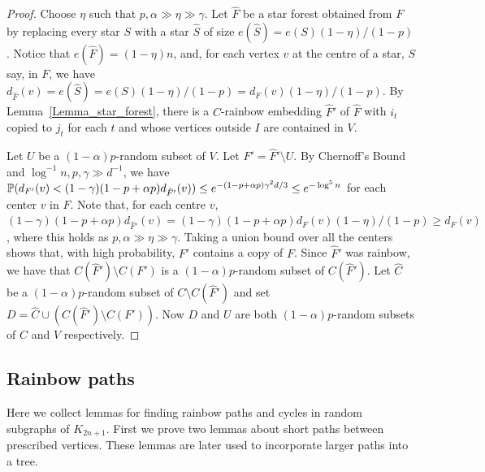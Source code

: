 \begin{proof}
Choose $\eta$ such that $p, \alpha \gg \eta\gg  \gamma$.
Let $\hat F$ be a star forest obtained from $F$ by replacing every star $S$ with a star $\hat S$ of size $e(\hat S)=e(S)(1-\eta)/(1-p)$. Notice that $e(\hat F)=(1-\eta)n$, and, for each vertex $v$ at the centre of a star, $S$ say, in $F$, we have $d_{\hat F}(v)=e(\hat S)=e(S)(1-\eta)/(1-p)=d_F(v)(1-\eta)/(1-p)$. By Lemma~\ref{Lemma_star_forest}, there  is a $C$-rainbow embedding $\hat F'$ of $\hat F$   with $i_t$ copied to $j_t$ for each $t$  and   whose  vertices outside $I$ are contained in $V$.

Let $U$ be a $(1-\alpha)p$-random subset of $V$. Let $F'=\hat F' \setminus U$.  By Chernoff's Bound and $\log^{-1}n, p, \gamma \gg d^{-1}$, we have $\P(d_{F'}(v)< (1-\gamma)(1-p+\alpha p)d_{\hat F'}(v))\leq e^{-(1-p+\alpha p)\gamma^2d/3}\leq e^{-\log^5 n}$ for each center $v$ in $F$. Note that, for each centre $v$, $(1-\gamma)(1-p+\alpha p)d_{\hat F'}(v)=(1-\gamma)(1-p+\alpha p) d_F(v)(1-\eta)/(1-p) \geq d_F(v)$, where this holds as $p,\alpha\gg \eta\gg \gamma$.  Taking a union bound over all the centers shows that, with high probability, $F'$ contains a copy of $F$.
Since $\hat F'$ was rainbow, we have that $C(\hat F')\setminus C(F')$ is a $(1-\alpha)p$-random subset of $C(\hat F')$.
Let $\hat{C}$ be a $(1-\alpha)p$-random subset of $C\setminus C(\hat F')$ and set $D=\hat{C}\cup (C(\hat F')\setminus C(F'))$. Now $D$ and $U$ are both $(1-\alpha)p$-random subsets of $C$ and $V$ respectively.
\end{proof}

\subsection{Rainbow paths}\label{Section_paths}
Here we collect lemmas for finding rainbow paths and cycles in random subgraphs of $K_{2n+1}$. First we prove two lemmas about short paths between prescribed vertices. These lemmas are later used to incorporate larger paths into a tree.

